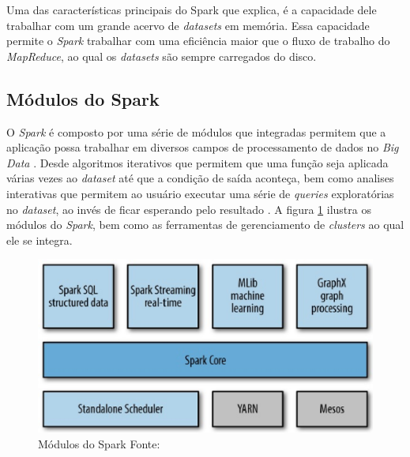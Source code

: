         Uma das características principais do Spark que  explica, é a capacidade dele trabalhar com um
        grande acervo de \textit{datasets} em memória. Essa capacidade permite o \textit{Spark} trabalhar com uma eficiência
        maior que o fluxo de trabalho do \textit{MapReduce}, ao qual os \textit{datasets} são sempre carregados do disco.

        \subsection{Módulos do Spark}

            O \textit{Spark} é composto por uma série de módulos que integradas permitem que a aplicação possa trabalhar em
            diversos campos de processamento de dados no \textit{Big Data} \cite{karau2015}. Desde algoritmos iterativos que
            permitem que uma função seja aplicada várias vezes ao \textit{dataset} até que a condição de saída aconteça, bem
            como analises interativas que permitem ao usuário executar uma série de \textit{queries} exploratórias no \textit{dataset},
            ao invés de ficar esperando pelo resultado \cite{white2015}. A figura \ref{figura13} ilustra os módulos do \textit{Spark},
            bem como as ferramentas de gerenciamento de \textit{clusters} ao qual ele se integra.

            \begin{figure}[ht!]
                        \centering
                        \includegraphics[keepaspectratio=true,scale=0.7]
                            {figuras/figura13.eps}
                        \caption[Módulos do Spark]{Módulos do Spark
                        \protect \linebreak Fonte: }
                        \label{figura13}
            \end{figure}


